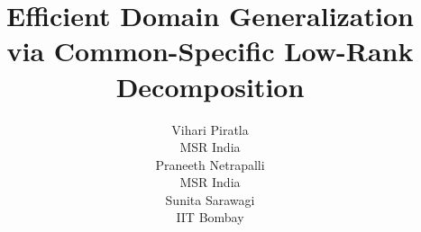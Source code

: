 \documentclass{article}
\title{Efficient Domain Generalization via Common-Specific Low-Rank Decomposition}
\author{
  Vihari Piratla \\
  MSR India\\
\And
 Praneeth Netrapalli \\
 MSR India\\
 \And
 Sunita Sarawagi \\
 IIT Bombay\\
}
\begin{document}
\maketitle
























\newcommand{\lab}{\ensuremath{y}}
\newcommand{\dom}{\ensuremath{d}}
\newcommand{\vgg}{\ensuremath{g}}
\newcommand{\pg}{P_{\vgg}}
\newcommand{\labspace}{\mathcal{Y}}
\newcommand{\domspace}{\mathcal{U}}
\newcommand{\ndom}{}
\newcommand{\dats}{\mathcal{D}_s}
\newcommand{\datt}{\mathcal{D}_t}
\newcommand{\model}{\mathcal{M}}
\newcommand{\func}{f}
\newcommand{\mos}{CSD}
\newcommand{\mosdescr}{Common-specific Decomposition.}
\newcommand{\mosr}{CSD-rand}
\newcommand{\cR}{\mathbf{r}_x}
\newcommand{\R}{\mathbb{R}}
\newcommand{\numC}{C}
\newcommand{\rank}{k}
\newcommand{\Span}[1]{\textrm{Span}\left({#1}\right)}
\newcommand{\Rank}[1]{\textrm{rank}\left({#1}\right)}
\newcommand{\defeq}{:=}
\newcommand{\What}{\widehat{W}}
\newcommand{\vtilde}{\widetilde{v}}
\newcommand{\iprod}[2]{\langle #1, #2 \rangle}
\newcommand{\norm}[1]{\left\|{#1} \right\|}
\newcommand{\ones}{\mathds{1}}
\newcommand{\frob}[1]{\left\|{#1} \right\|_F}
\newcommand{\trans}[1]{{#1}^{\top}}
\newcommand{\praneeth}[1]{{\color{red} PN: #1}}
\newcommand{\vihari}[1]{{\color{blue} Vihari: #1}}
\newcommand{\sunita}[1]{{\color{magenta} Sunita: #1}}
\newtheorem{theorem}{Theorem}
\newtheorem{assumption}{Assumption}
\newtheorem{remark}{Remark}[section]
\newtheorem{corollary}{Corollary}[section]
\newtheorem{lemma}{Lemma}
\newtheorem{proposition}{Proposition}
\theoremstyle{definition}
\newtheorem{defn}{Definition}
\newcommand{\wtilde}{\widetilde{w}}
\newcommand{\Utilde}{\widetilde{U}}
\newcommand{\Stilde}{\widetilde{\Sigma}}
\newcommand{\Vtilde}{\widetilde{V}}
\newcommand{\Wtilde}{\widetilde{W}}
\end{document}
